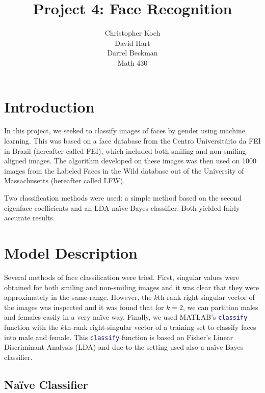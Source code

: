 \documentclass[hidelinks,11pt]{article}
\begin{document}
\title{Project 4: Face Recognition}
\author{Christopher Koch\\David Hart\\Darrel Beckman\\
Math 430}
\maketitle

\section{Introduction}
\label{sec:intro}

In this project, we seeked to classify images of faces by gender using machine
learning. This was based on a face database\cite{fei} from the Centro
Universitário da FEI in Brazil (hereafter called FEI), which included both
smiling and non-smiling aligned images. The algorithm developed on these images
was then used on 1000 images from the Labeled Faces in the Wild database out of
the University of Massachusetts\cite{lfw} (hereafter called LFW). 

Two classification methods were used: a simple method based on the second
eigenface coefficients and an LDA na\"ive Bayes classifier. Both yielded
fairly accurate results.

\section{Model Description}
\label{sec:model}

Several methods of face classification were tried. First, singular values were
obtained for both smiling and non-smiling images and it was clear that they were
approximately in the same range. However, the $k$th-rank right-singular vector
of the images was inspected and it was found that for $k = 2$, we can partition
males and females easily in a very na\"ive way. Finally, we used MATLAB's
\lstinline[language=Matlab]{classify} function with the $k$th-rank
right-singular vector of a training set to classify faces into male and female.
This \lstinline[language=Matlab]{classify} function is based on Fisher's Linear
Discriminant Analysis (LDA) and due to the setting used also a na\"ive Bayes
classifier.

\subsection{Na\"ive Classifier}
\label{sec:model:naive}
\end{document}
